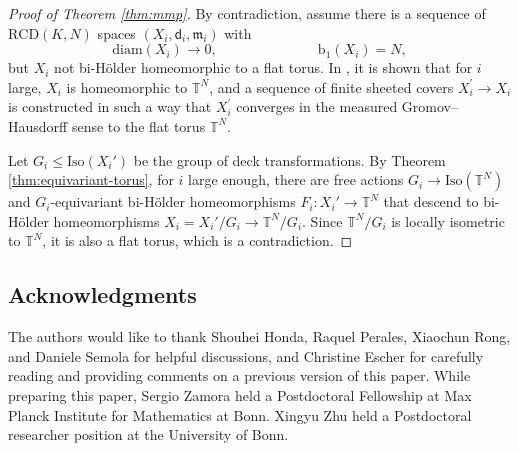 \documentclass[12pt]{amsart}
\theoremstyle{definition}
\numberwithin{equation}{section}
\newcommand{\diam}{{\text {diam}}}
\newcommand{\bet}{\text{b}_1}
\newcommand{\iso}{\text{Iso}}
\newcommand{\rcd}{\text{RCD}}
\newcommand{\mm}{\mathfrak{m}}
\begin{document}
\begin{proof}[Proof of Theorem \ref{thm:mmp}] By contradiction, assume there is a sequence of $\rcd (K,N)$ spaces $(X_i, \mathsf{d}_i, \mm_i)$ with 
\[ \diam (X_i) \to 0,  \hspace{3cm}  \bet (X_i) = N , \]
but $X_i$ not bi-H\"older homeomorphic to a flat torus. In \cite{mondello-mondino-perales}, it is shown that for $i$ large, $X_i$ is homeomorphic to $\mathbb{T}^N$, and a sequence of finite sheeted covers $X_i^{\prime} \to X_i$ is constructed in such a way that $X_i^{\prime}$ converges in the measured Gromov--Hausdorff sense to the flat torus $ \mathbb{T}^N$. 

Let $G_i \leq \iso (X_i')$ be the group of deck transformations. By Theorem \ref{thm:equivariant-torus}, for $i$ large enough, there are free actions $G_i \to \iso (\mathbb{T}^N)$ and $G_i$-equivariant bi-H\"older homeomorphisms $F_i : X_i ' \to \mathbb{T}^N$ that descend to bi-H\"older homeomorphisms $X_i = X_i ' / G_i \to \mathbb{T}^N/G_i$. Since $\mathbb{T}^N/G_i$ is locally isometric to $\mathbb{T}^N$, it is also a flat torus, which is a contradiction.
\end{proof}


\subsection{Acknowledgments}
The authors would like to thank Shouhei Honda, Raquel Perales, Xiaochun Rong, and Daniele Semola for helpful discussions, and Christine Escher for carefully reading and providing comments on a previous version of this paper. While preparing this paper, Sergio Zamora held a Postdoctoral Fellowship at Max Planck Institute for Mathematics at Bonn. Xingyu Zhu held a Postdoctoral researcher position at the University of Bonn.
\end{document}
